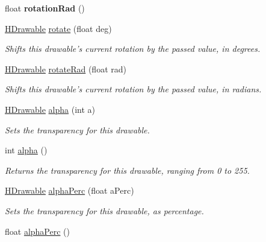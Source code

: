 \begin{DoxyCompactItemize}
\item 
\hypertarget{classhype_1_1drawable_1_1_h_drawable_a11f92096fcd9835477a861e7d60c9975}{float {\bfseries rotation\-Rad} ()}\label{classhype_1_1drawable_1_1_h_drawable_a11f92096fcd9835477a861e7d60c9975}

\item 
\hyperlink{classhype_1_1drawable_1_1_h_drawable}{H\-Drawable} \hyperlink{classhype_1_1drawable_1_1_h_drawable_a8653551b0b72c984441c981240339933}{rotate} (float deg)
\begin{DoxyCompactList}\small\item\em Shifts this drawable's current rotation by the passed value, in degrees. \end{DoxyCompactList}\item 
\hyperlink{classhype_1_1drawable_1_1_h_drawable}{H\-Drawable} \hyperlink{classhype_1_1drawable_1_1_h_drawable_a6e123a6ba9376fbc08d1b622bfcfeb95}{rotate\-Rad} (float rad)
\begin{DoxyCompactList}\small\item\em Shifts this drawable's current rotation by the passed value, in radians. \end{DoxyCompactList}\item 
\hyperlink{classhype_1_1drawable_1_1_h_drawable}{H\-Drawable} \hyperlink{classhype_1_1drawable_1_1_h_drawable_a03c7275f5caab5cc9034b18d4c2f1305}{alpha} (int a)
\begin{DoxyCompactList}\small\item\em Sets the transparency for this drawable. \end{DoxyCompactList}\item 
int \hyperlink{classhype_1_1drawable_1_1_h_drawable_a3cdefeadb2538268501043a0ca07177e}{alpha} ()
\begin{DoxyCompactList}\small\item\em Returns the transparency for this drawable, ranging from 0 to 255. \end{DoxyCompactList}\item 
\hyperlink{classhype_1_1drawable_1_1_h_drawable}{H\-Drawable} \hyperlink{classhype_1_1drawable_1_1_h_drawable_a0b94a8de9bf539f1d5a16fcdea544fbb}{alpha\-Perc} (float a\-Perc)
\begin{DoxyCompactList}\small\item\em Sets the transparency for this drawable, as percentage. \end{DoxyCompactList}\item 
float \hyperlink{classhype_1_1drawable_1_1_h_drawable_a6c3f8eae8eeaa68ee76003d732b99bac}{alpha\-Perc} ()

\end{DoxyCompactItemize}
